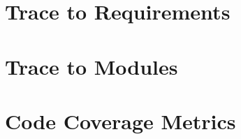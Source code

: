 \documentclass[12pt, titlepage]{article}
\begin{document}
\section{Trace to Requirements}
		
\section{Trace to Modules}		

\section{Code Coverage Metrics}




\end{document}
